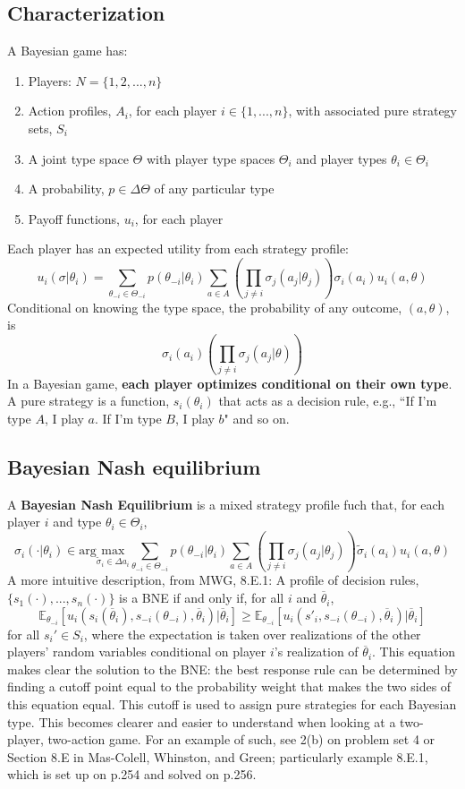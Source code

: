 \documentclass{article}
\newcommand{\red}[1]{{\color{red}#1}}
\newcommand{\Et}[2]{\mathbb{E}_{#1}\left[#2\right]}
\begin{document}
\subsection{Characterization}
A Bayesian game has:
\begin{enumerate}
	\item Players: $N = \{1,2,...,n\}$
	\item Action profiles, $A_i$, for each player $i\in\{1,...,n\}$, with associated pure strategy sets, $S_i$
	\item A joint type space $\Theta$ with player type spaces $\Theta_i$ and player types ${\theta_i\in\Theta_i}$
	\item A probability, ${p\in\Delta\Theta}$ of any particular type
	\item Payoff functions, $u_i$, for each player 
\end{enumerate}
Each player has an expected utility from each strategy profile:
\[
	u_i(\sigma|\theta_i) = \sum_{\theta_{-i}\in\Theta_{-i}}p(\theta_{-i}|\theta_i)\sum_{a\in A}\left(\prod_{j\neq i}\sigma_j(a_j|\theta_j)\right)\sigma_i(a_i)u_i(a,\theta)
\]
Conditional on knowing the type space, the probability of any outcome, $(a,\theta)$, is
\[
	\sigma_i(a_i)\left(\prod_{j\neq i}\sigma_j(a_j|\theta)\right)
\]
In a Bayesian game, \textbf{each player optimizes conditional on their own type}. A pure strategy is a function, $s_i(\theta_i)$ that acts as a decision rule, e.g., ``If I'm type $A$, I play $a$. If I'm type $B$, I play $b$" and so on. 

\subsection{Bayesian Nash equilibrium}
A \textbf{Bayesian Nash Equilibrium} is a mixed strategy profile fuch that, for each player $i$ and type ${\theta_i\in\Theta_i}$,
\[
	\sigma_i(\cdot|\theta_i)\in\text{arg}\underset{\tilde{\sigma}_i\in\Delta a_i}{\text{max}}\sum_{\theta_{-i}\in\Theta_{-i}}p(\theta_{-i}|\theta_i)\sum_{a\in A}\left(\prod_{j\neq i}\sigma_j(a_j|\theta_j)\right)\tilde{\sigma}_i(a_i)u_i(a,\theta)
\]
A more intuitive description, from MWG, 8.E.1: A profile of decision rules, ${\{s_1(\cdot),...,s_n(\cdot)\}}$ is a BNE if and only if, for all $i$ and $\overline{\theta}_i$,
\[
	\Et{\theta_{-i}}{u_i(s_i(\overline{\theta}_i),s_{-i}(\theta_{-i}),\overline{\theta}_i)|\overline{\theta}_i}\geq\Et{\theta_{-i}}{u_i(s'_i,s_{-i}(\theta_{-i}),\overline{\theta}_i)|\overline{\theta}_i}
\]
for all $s_i'\in S_i$, where the expectation is taken over realizations of the other players' random variables conditional on player $i$'s realization of $\overline{\theta}_i$. This equation makes clear the solution to the BNE: the best response rule can be determined by finding a cutoff point equal to the probability weight that makes the two sides of this equation equal. This cutoff is used to assign pure strategies for each Bayesian type. This becomes clearer and easier to understand when looking at a two-player, two-action game. For an example of such, see \red{2(b) on problem set 4} or \red{Section 8.E in Mas-Colell, Whinston, and Green}; particularly example 8.E.1, which is set up on p.254 and solved on p.256.
\end{document}
